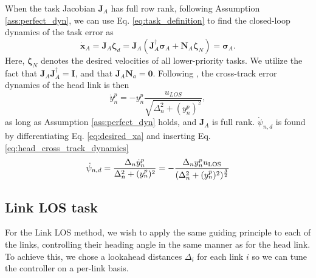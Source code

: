 \documentclass[../main.tex]{subfiles}
\begin{document}
When the task Jacobian $\bm{J}_A$ has full row rank, following Assumption \ref{ass:perfect_dyn}, we can use Eq. \eqref{eq:task_definition} to find the closed-loop dynamics of the task error as
\begin{equation}
    \label{eq:task_a_dyn}
    \dot{\bm{x}}_A = \bm{J}_A \bm{\zeta}_d
    = \bm{J}_A \left(\bm{J}_A^{\dagger} \bm{\sigma}_A + \bm{N}_A \bm{\zeta}_{N} \right)
    = \bm{\sigma}_A.
\end{equation}
Here, $\bm{\zeta}_{N}$ denotes the desired velocities of all lower-priority tasks. We utilize the fact that $\bm{J}_A \bm{J}_A^{\dagger} = \bm{I}$, and that $\bm{J}_A \bm{N}_a = \bm{0}$. Following \cite{fossen2014}, the cross-track error dynamics of the head link is then
\begin{equation}
    \label{eq:head_cross_track_dynamics}
    \dot{y}_n^p = - y_n^p\frac{u_{LOS}}{\sqrt{\Delta_n^2 + (y_n^p)^2}},
\end{equation}
as long as Assumption \ref{ass:perfect_dyn} holds, and $\bm{J}_A$ is full rank. $\dot{\psi}_{n, d}$ is found by differentiating Eq. \eqref{eq:desired_xa} and inserting Eq. \eqref{eq:head_cross_track_dynamics}
\begin{equation}
    \label{eq:psi_d_dot}
    \dot{\psi}_{n, d} = \frac{\Delta_n \dot{y}^p_n}{\Delta_n^2 + (y^p_n)^2} = -\frac{\Delta_n y^p_n u_{\rm LOS}}{(\Delta_n^2 + (y^p_n)^2)^{\frac{3}{2}}}
\end{equation}

\subsection{Link LOS task}
\label{sec:linkLOS}
For the Link LOS method, we wish to apply the same guiding principle to each of the links, controlling their heading angle in the same manner as for the head link. To achieve this, we chose a lookahead distances $\Delta_i$ for each link $i$ so we can tune the controller on a per-link basis.
\end{document}
